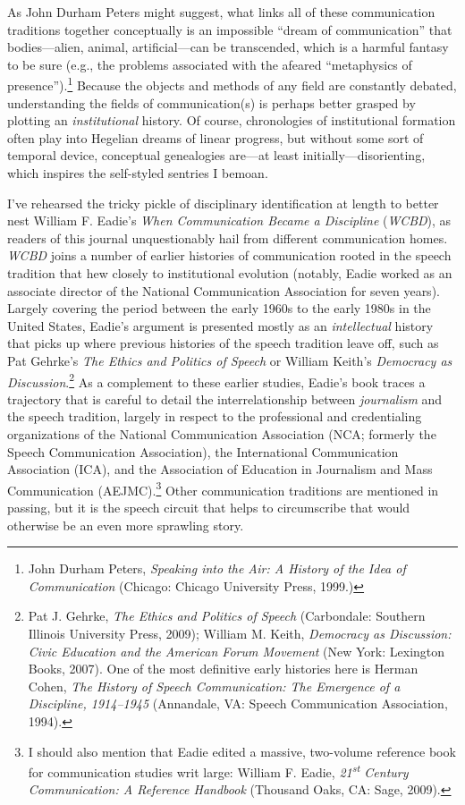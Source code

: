 \documentclass{tufte-handout}
\begin{document}
As John Durham Peters might suggest, what links all of these
communication traditions together conceptually is an impossible ``dream
of communication'' that bodies---alien, animal, artificial---can be
transcended, which is a harmful fantasy to be sure (e.g., the problems
associated with the afeared ``metaphysics of presence'').\footnote{John
  Durham Peters, \emph{Speaking into the Air: A History of the Idea of
  Communication} (Chicago: Chicago University Press, 1999.)} Because the
objects and methods of any field are constantly debated, understanding
the fields of communication(s) is perhaps better grasped by plotting an
\emph{institutional} history. Of course, chronologies of institutional
formation often play into Hegelian dreams of linear progress, but
without some sort of temporal device, conceptual genealogies are---at
least initially---disorienting, which inspires the self-styled sentries
I bemoan.

I've rehearsed the tricky pickle of disciplinary identification at
length to better nest William F. Eadie's \emph{When Communication Became
a Discipline} (\emph{WCBD}), as readers of this journal unquestionably
hail from different communication homes. \emph{WCBD} joins a number of
earlier histories of communication rooted in the speech tradition that
hew closely to institutional evolution (notably, Eadie worked as an
associate director of the National Communication Association for seven
years). Largely covering the period between the early 1960s to the early
1980s in the United States, Eadie's argument is presented mostly as an
\emph{intellectual} history that picks up where previous histories of
the speech tradition leave off, such as Pat Gehrke's \emph{The Ethics
and Politics of Speech} or William Keith's \emph{Democracy as
Discussion}.\footnote{Pat J. Gehrke, \emph{The Ethics and Politics of
  Speech} (Carbondale: Southern Illinois University Press, 2009);
  William M. Keith, \emph{Democracy as Discussion: Civic Education and
  the American Forum Movement} (New York: Lexington Books, 2007). One of
  the most definitive early histories here is Herman Cohen, \emph{The
  History of Speech Communication: The Emergence of a Discipline,
  1914--1945} (Annandale, VA: Speech Communication Association, 1994).}
As a complement to these earlier studies, Eadie's book traces a
trajectory that is careful to detail the interrelationship between
\emph{journalism} and the speech tradition, largely in respect to the
professional and credentialing organizations of the National
Communication Association (NCA; formerly the Speech Communication
Association), the International Communication Association (ICA), and the
Association of Education in Journalism and Mass Communication
(AEJMC).\footnote{I should also mention that Eadie edited a massive,
  two-volume reference book for communication studies writ large:
  William F. Eadie, \emph{21\textsuperscript{st} Century Communication:
  A Reference Handbook} (Thousand Oaks, CA: Sage, 2009).} Other
communication traditions are mentioned in passing, but it is the speech
circuit that helps to circumscribe that would otherwise be an even more
sprawling story.
\end{document}
